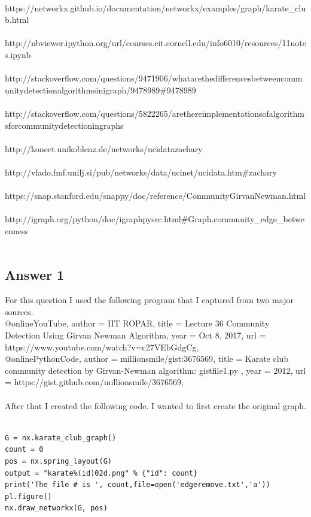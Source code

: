 \documentclass[10pt,letterpaper]{article}
\begin{document}
\\
https://networkx.github.io/documentation/networkx/examples/graph/karate\_club.html\\
\\
http://nbviewer.ipython.org/url/courses.cit.cornell.edu/info6010/resources/11notes.ipynb\\
\\
http://stackoverflow.com/questions/9471906/what\-are\-the\-differences\-between\-community\-detection\-algorithms\-in\-igraph/9478989\#9478989\\
\\
http://stackoverflow.com/questions/5822265/are\-there\-implementations\-of\-algorithms\-for\-community\-detection\-in\-graphs\\
\\
http://konect.uni\-koblenz.de/networks/ucidata\-zachary\\
\\
http://vlado.fmf.uni\-lj.si/pub/networks/data/ucinet/ucidata.htm\#zachary\\
\\
https://snap.stanford.edu/snappy/doc/reference/CommunityGirvanNewman.html\\
\\
http://igraph.org/python/doc/igraph\-pysrc.html\#Graph.community\_edge\_betweenness\\
\\
\pagebreak 
\subsection{Answer 1}

For this question I used the following program that I captured from two major sources.\\ 

@online{YouTube,
author = {IIT ROPAR},
title = {Lecture 36 Community Detection Using Girvan Newman Algorithm},
year = {Oct 8, 2017},
url = {https://www.youtube.com/watch?v=c27VEbGdgCg},
}
\\
@online{PythonCode,
author = {millionsmile/gist:3676569},
title = {Karate club community detection by Girvan-Newman algorithm: gistfile1.py },
year = {2012},
url = {https://gist.github.com/millionsmile/3676569},
}
\\
\\
After that I created the following code.  I wanted to first create the original graph.\\
\\
\begin{lstlisting}
G = nx.karate_club_graph()
count = 0
pos = nx.spring_layout(G)
output = "karate%(id)02d.png" % {"id": count}
print('The file # is ', count,file=open('edgeremove.txt','a'))
pl.figure()
nx.draw_networkx(G, pos)
\end{lstlisting}
\end{document}
